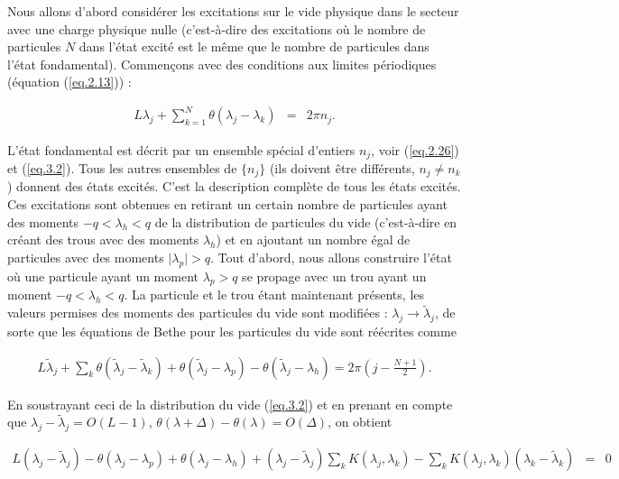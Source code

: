 
Nous allons d'abord considérer les excitations sur le vide physique dans le secteur avec une charge physique nulle (c'est-à-dire des excitations où le nombre de particules \( N \) dans l'état excité est le même que le nombre de particules dans l'état fondamental). Commençons avec des conditions aux limites périodiques (équation (\ref{eq.2.13})) :

\begin{eqnarray*}
	L\lambda_j + \sum_{k=1}^N\theta( \lambda_j - \lambda_k ) & =  &2 \pi n_j.
\end{eqnarray*}



L'état fondamental est décrit par un ensemble spécial d'entiers $n_j$, voir (\ref{eq.2.26}) et (\ref{eq.3.2}). Tous les autres ensembles de $\{n_j\}$ (ils doivent être différents, $n_j \neq n_k$) donnent des états excités. C'est la description complète de tous les états excités. Ces excitations sont obtenues en retirant un certain nombre de particules ayant des moments $-q < \lambda_h < q$ de la distribution de particules du vide (c'est-à-dire en créant des trous avec des moments $\lambda_h$) et en ajoutant un nombre égal de particules avec des moments $ \vert \lambda_p \vert  > q$. Tout d'abord, nous allons construire l'état où une particule ayant un moment $\lambda_p  > q$ se propage avec un trou ayant un moment $-q < \lambda_h < q$. La particule et le trou étant maintenant présents, les valeurs permises des moments des particules du vide sont modifiées : $\lambda_j  \to  \tilde{\lambda}_j$, de sorte que les équations de Bethe pour les particules du vide sont réécrites comme

\begin{eqnarray}
	L \tilde{\lambda}_j + \sum_k \theta ( \tilde{\lambda}_j - \tilde{\lambda}_k ) + \theta(\tilde{\lambda}_j - \lambda_p ) - \theta(\tilde{\lambda}_j - \lambda_h ) = 2 \pi \left (  j - \frac{N+1}{2}\right ).  
\end{eqnarray}

En soustrayant ceci de la distribution du vide (\ref{eq.3.2}) et en prenant en compte que $\lambda_j - \tilde{\lambda}_j = O(L-1 )$, $\theta(\lambda + \Delta) - \theta(\lambda) = O(\Delta)$, on obtient

\begin{eqnarray}
	L (\lambda_j - \tilde{\lambda}_j ) - \theta (\lambda_j - \lambda_p)	+ \theta( \lambda_j - \lambda_h ) + ( \lambda_j -\tilde{\lambda}_j ) \sum_k K ( \lambda_j , \lambda_k ) - \sum_k K( \lambda_j , \lambda_k ) ( \lambda_k - \tilde{\lambda}_k ) & = & 0 
\end{eqnarray}

